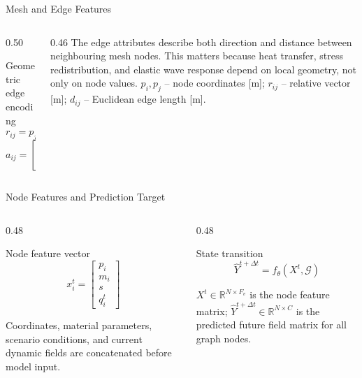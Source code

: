 \begin{frame}{Mesh and Edge Features}
  \begin{columns}[T]
    \begin{column}{0.50\textwidth}
      \begin{block}{Geometric edge encoding}
        \[
          r_{ij}=p_j-p_i,\qquad d_{ij}=\|r_{ij}\|_2
        \]
        \[
          a_{ij}=\begin{bmatrix}r_{ij}\\ d_{ij}\end{bmatrix}
        \]
      \end{block}
    \end{column}
    \begin{column}{0.46\textwidth}
      \footnotesize
      The edge attributes describe both direction and distance between
      neighbouring mesh nodes.
      \vskip 4pt
      This matters because heat transfer, stress redistribution, and elastic
      wave response depend on local geometry, not only on node values.
      \vskip 4pt
      \scriptsize
      $p_i,p_j$ -- node coordinates [m]; $r_{ij}$ -- relative vector [m];
      $d_{ij}$ -- Euclidean edge length [m].
    \end{column}
  \end{columns}
\end{frame}

\begin{frame}{Node Features and Prediction Target}
  \begin{columns}[T]
    \begin{column}{0.48\textwidth}
      \begin{block}{Node feature vector}
        \[
          x_i^t=\begin{bmatrix}p_i\\ m_i\\ s\\ q_i^t\end{bmatrix}
        \]
      \end{block}
      \footnotesize
      Coordinates, material parameters, scenario conditions, and current
      dynamic fields are concatenated before model input.
    \end{column}
    \begin{column}{0.48\textwidth}
      \begin{block}{State transition}
        \[
          \hat{Y}^{t+\Delta t}=f_{\theta}(X^t,\mathcal{G})
        \]
      \end{block}
      \scriptsize
      $X^t\in\mathbb{R}^{N\times F_v}$ is the node feature matrix;
      $\hat{Y}^{t+\Delta t}\in\mathbb{R}^{N\times C}$ is the predicted
      future field matrix for all graph nodes.
    \end{column}
  \end{columns}
\end{frame}

